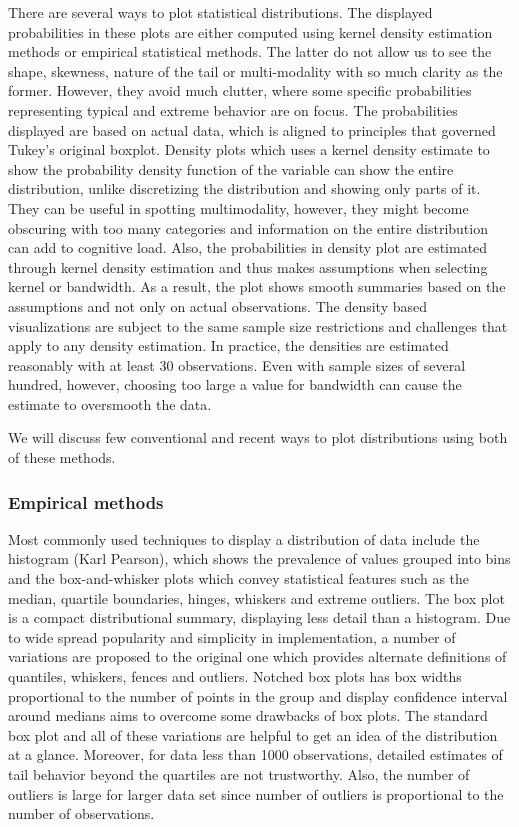 \documentclass[12pt]{article}
\begin{document}
There are several ways to plot statistical distributions. The displayed
probabilities in these plots are either computed using kernel density
estimation methods or empirical statistical methods. The latter do not
allow us to see the shape, skewness, nature of the tail or
multi-modality with so much clarity as the former. However, they avoid
much clutter, where some specific probabilities representing typical and
extreme behavior are on focus. The probabilities displayed are based on
actual data, which is aligned to principles that governed Tukey's
original boxplot. Density plots which uses a kernel density estimate to
show the probability density function of the variable can show the
entire distribution, unlike discretizing the distribution and showing
only parts of it. They can be useful in spotting multimodality, however,
they might become obscuring with too many categories and information on
the entire distribution can add to cognitive load. Also, the
probabilities in density plot are estimated through kernel density
estimation and thus makes assumptions when selecting kernel or
bandwidth. As a result, the plot shows smooth summaries based on the
assumptions and not only on actual observations. The density based
visualizations are subject to the same sample size restrictions and
challenges that apply to any density estimation. In practice, the
densities are estimated reasonably with at least 30 observations. Even
with sample sizes of several hundred, however, choosing too large a
value for bandwidth can cause the estimate to oversmooth the data.

We will discuss few conventional and recent ways to plot distributions
using both of these methods.

\hypertarget{empirical-methods}{%
\subsubsection{Empirical methods}\label{empirical-methods}}

Most commonly used techniques to display a distribution of data include
the histogram (Karl Pearson), which shows the prevalence of values
grouped into bins and the box-and-whisker plots \citep{Tukey1977-jx}
which convey statistical features such as the median, quartile
boundaries, hinges, whiskers and extreme outliers. The box plot is a
compact distributional summary, displaying less detail than a histogram.
Due to wide spread popularity and simplicity in implementation, a number
of variations are proposed to the original one which provides alternate
definitions of quantiles, whiskers, fences and outliers. Notched box
plots \citep[1978]{Mcgill1978-hg} has box widths proportional to the
number of points in the group and display confidence interval around
medians aims to overcome some drawbacks of box plots. The standard box
plot and all of these variations are helpful to get an idea of the
distribution at a glance. Moreover, for data less than 1000
observations, detailed estimates of tail behavior beyond the quartiles
are not trustworthy. Also, the number of outliers is large for larger
data set since number of outliers is proportional to the number of
observations.
\end{document}
